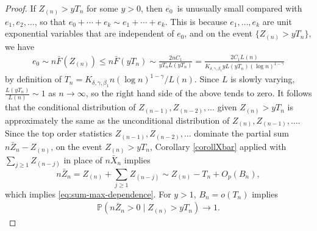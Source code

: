 \documentclass[10pt,a4paper]{amsart}
\def\Prob{{\mathbb P}}
\def\Zmax{Z_{(n)}}
\begin{document}
\begin{proof}
	
	If $\Zmax > yT_n$ for some $y > 0$, then $e_0$~is unusually small compared with $e_1, e_2,\ldots$, so that $e_0 + \cdots + e_k \sim e_1 + \cdots + e_k$. This is because $e_1,\dots,e_k$ are unit exponential variables that are independent of $e_0$, and on the event $\{Z_{(n)}>yT_n\}$, we have
    \begin{align*}
        e_0 \sim n\bar{F}(Z_{(n)}) \leq n\bar{F}(yT_n) \sim \frac{2nC_1}{yT_n L(yT_n)} = \frac{2C_1 L(n)}{K_{\delta,\gamma,\beta_1} yL(yT_n)(\log n)^{1-\gamma}}
    \end{align*}
    by definition of $T_n=K_{\delta,\gamma,\beta_1} n (\log n)^{1-\gamma}/L(n)$. Since $L$ is slowly varying, $\frac{L(yT_n)}{L(n)} \sim 1$ as $n\to\infty$, so the right hand side of the above tends to zero.
    It follows that the conditional distribution of $Z_{(n-1)}, Z_{(n-2)},\ldots$ given $\Zmax > y T_n$ is approximately the same
	as the unconditional distribution of $\Zmax, Z_{(n-1)},\dots$.
	Since the top order statistics $Z_{(n-1)}, Z_{(n-2)},\ldots$ dominate the partial sum $n \bar Z_n - \Zmax$, on the event $\Zmax > y T_n$, Corollary \ref{corollXbar} applied with $\sum_{j \ge1} Z_{(n-j)}$ in place of $n \bar X_n$ implies
	\begin{equation}\label{eq16}
	n \bar Z_n = \Zmax + \sum_{j \ge1} Z_{(n-j)} \sim \Zmax - T_n + O_p(B_n),
	\end{equation}
	which implies \eqref{eq:sum-max-dependence}. For $y>1$, $B_n = o(T_n)$ implies
	\begin{align*}
	\Prob(n\bar{Z}_n > 0 \mid Z_{(n)}>yT_n) \to 1.
	\end{align*}
\end{proof}
\end{document}
